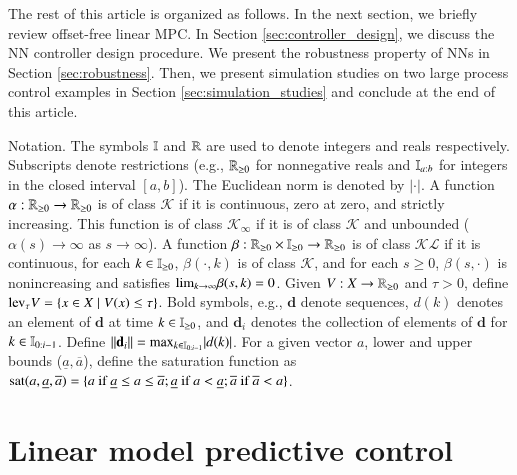 \documentclass[preprint,5p, twocolumn, authoryear]{elsarticle}
\begin{document}
The rest of this article is organized as follows. 
In the next section, we briefly review 
offset-free linear MPC. 
In Section \ref{sec:controller_design},
we discuss the NN 
controller design procedure.
We present the robustness property
of NNs in Section \ref{sec:robustness}.
Then, we present simulation studies
on two large process control examples
in Section \ref{sec:simulation_studies}
and conclude at the end of this article.

Notation. The symbols $\mathbb{I}$ and $\mathbb{R}$ are 
used to denote integers and reals respectively. 
Subscripts denote restrictions 
(e.g., $\mathbb{R}_{\geq 0}$ for nonnegative reals and 
$\mathbb{I}_{a:b}$ for integers in the 
closed interval $[a, b]$). The Euclidean norm 
is denoted by $\vert \cdot \vert$. A function 
$\alpha : \mathbb{R}_{\geq 0} \rightarrow \mathbb{R}_{\geq 0}$
is of class $\mathcal{K}$ if it is continuous, zero 
at zero, and strictly increasing. This function is of class 
$\mathcal{K}_{\infty}$ if it is of class $\mathcal{K}$
and unbounded ($\alpha(s) \rightarrow \infty$ as 
$s \rightarrow \infty$). A function
$\beta : \mathbb{R}_{\geq 0} \times \mathbb{I}_{\geq 0} \rightarrow \mathbb{R}_{\geq 0}$
is of class $\mathcal{KL}$ if it is continuous,
for each $k \in \mathbb{I}_{\geq 0}$, $\beta(\cdot, k)$ is of class $\mathcal{K}$,
and for each $s \geq 0$, $\beta(s, \cdot)$ is nonincreasing
and satisfies $\textnormal{lim}_{k \rightarrow \infty} \beta(s, k) = 0$.
Given $V : X \rightarrow \mathbb{R}_{\geq 0}$ and $\tau > 0$, define 
$\textnormal{lev}_{\tau} V = \{ x \in X \mid V(x) \leq \tau \}$.
Bold symbols, e.g., $\mathbf{d}$ denote sequences, 
$d(k)$ denotes an element of $\mathbf{d}$ at time 
$k \in \mathbb{I}_{\geq 0}$, and $\mathbf{d}_i$ 
denotes the collection of elements of 
$\mathbf{d}$ for $k \in \mathbb{I}_{0:i-1}$.
Define $\vert \vert \mathbf{d}_i \vert \vert = 
\textnormal{max}_{k \in \mathbb{I}_{0:i-1}} \vert d(k) \vert$.
For a given vector $a$, lower and upper bounds 
($\underline{a}, \overline{a}$), define the saturation function 
as $\textnormal{sat}(a, \underline{a}, \overline{a}) = 
\{ a \ \textnormal{if} \ \underline{a} \leq a \leq \overline{a}; 
\underline{a} \ \textnormal{if} \ a < \underline{a};
\overline{a} \ \textnormal{if} \ \overline{a} < a \}$.

\section{Linear model predictive control} \label{sec:mpc}
\end{document}
